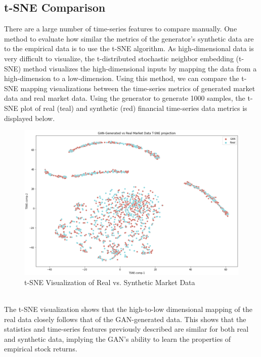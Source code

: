 \subsection{t-SNE Comparison}
There are a large number of time-series features to compare manually. One method to evaluate how similar the metrics of the generator's synthetic data are to the empirical data is to use the t-SNE \cite{tsne} algorithm. As high-dimensional data is very difficult to visualize, the t-distributed stochastic neighbor embedding (t-SNE) method visualizes the high-dimensional inputs by mapping the data from a high-dimension to a low-dimension. Using this method, we can compare the t-SNE mapping visualizations between the time-series metrics of generated market data and real market data. Using the generator to generate 1000 samples, the t-SNE plot of real (teal) and synthetic (red) financial time-series data metrics is displayed below.
\begin{figure}[h]
\centering
\includegraphics[width=14cm]{templates/assets/gan/tsne.png}
\caption{t-SNE Visualization of Real vs. Synthetic Market Data}
\end{figure}
\\
The t-SNE visualization shows that the high-to-low dimensional mapping of the real data closely follows that of the GAN-generated data. This shows that the statistics and time-series features previously described are similar for both real and synthetic data, implying the GAN's ability to learn the properties of empirical stock returns.
